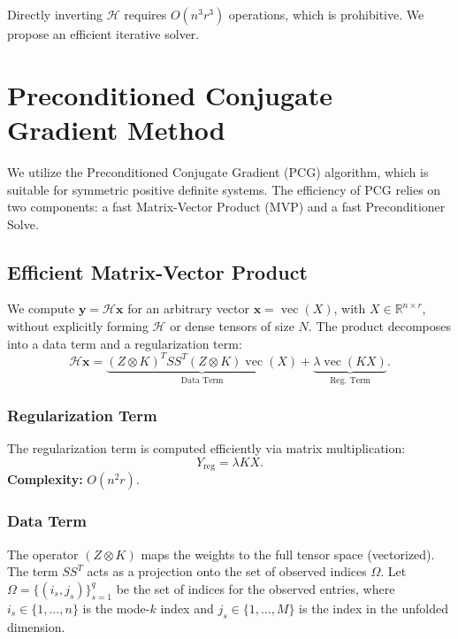 \documentclass[11pt]{article}
\newcommand{\R}{\mathbb{R}}
\newcommand{\vecop}{\operatorname{vec}}
\newcommand{\Kron}{\otimes}
\begin{document}
Directly inverting $\mathcal{H}$ requires $O(n^3 r^3)$ operations, which is prohibitive. We propose an efficient iterative solver.

\section{Preconditioned Conjugate Gradient Method}

We utilize the Preconditioned Conjugate Gradient (PCG) algorithm, which is suitable for symmetric positive definite systems. The efficiency of PCG relies on two components: a fast Matrix-Vector Product (MVP) and a fast Preconditioner Solve.

\subsection{Efficient Matrix-Vector Product}

We compute $\mathbf{y} = \mathcal{H} \mathbf{x}$ for an arbitrary vector $\mathbf{x} = \vecop(X)$, with $X \in \R^{n \times r}$, without explicitly forming $\mathcal{H}$ or dense tensors of size $N$. The product decomposes into a data term and a regularization term:
\[
    \mathcal{H} \mathbf{x} = \underbrace{(Z \Kron K)^T S S^T (Z \Kron K) \vecop(X)}_{\text{Data Term}} + \underbrace{\lambda \vecop(K X)}_{\text{Reg. Term}}.
\]

\subsubsection{Regularization Term}
The regularization term is computed efficiently via matrix multiplication:
\[ Y_{\text{reg}} = \lambda K X. \]
\textbf{Complexity:} $O(n^2 r)$.

\subsubsection{Data Term}
The operator $(Z \Kron K)$ maps the weights to the full tensor space (vectorized). The term $S S^T$ acts as a projection onto the set of observed indices $\Omega$.
Let $\Omega = \{(i_s, j_s)\}_{s=1}^q$ be the set of indices for the observed entries, where $i_s \in \{1,\dots,n\}$ is the mode-$k$ index and $j_s \in \{1,\dots,M\}$ is the index in the unfolded dimension.
\end{document}
